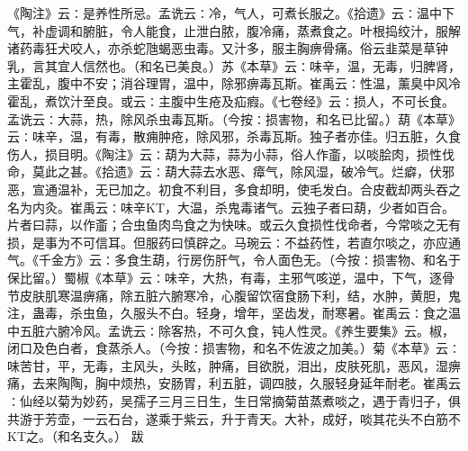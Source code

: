 \documentclass[a4paper,12pt,UTF8,twoside]{ctexbook}
\begin{document}
《陶注》云∶是养性所忌。孟诜云∶冷，气人，可煮长服之。《拾遗》云∶温中下气，补虚调和腑脏，令人能食，止泄白脓，腹冷痛，蒸煮食之。叶根捣绞汁，服解诸药毒狂犬咬人，亦杀蛇虺蝎恶虫毒。又汁多，服主胸痹骨痛。俗云韭菜是草钟乳，言其宜人信然也。（和名已美良。）苏《本草》云∶味辛，温，无毒，归脾肾，主霍乱，腹中不安；消谷理胃，温中，除邪痹毒瓦斯。崔禹云∶性温，薰臭中风冷霍乱，煮饮汁至良。或云∶主腹中生疮及疝瘕。《七卷经》云∶损人，不可长食。孟诜云∶大蒜，热，除风杀虫毒瓦斯。（今按∶损害物，和名已比留。）葫《本草》云∶味辛，温，有毒，散痈肿疮，除风邪，杀毒瓦斯。独子者亦佳。归五脏，久食伤人，损目明。《陶注》云∶葫为大蒜，蒜为小蒜，俗人作齑，以啖脍肉，损性伐命，莫此之甚。《拾遗》云∶葫大蒜去水恶、瘴气，除风湿，破冷气。烂癖，伏邪恶，宣通温补，无已加之。初食不利目，多食却明，使毛发白。合皮截却两头吞之名为内灸。崔禹云∶味辛KT，大温，杀鬼毒诸气。云独子者曰葫，少者如百合。片者曰蒜，以作齑；合虫鱼肉鸟食之为快味。或云久食损性伐命者，今常啖之无有损，是事为不可信耳。但服药曰慎辟之。马琬云∶不益药性，若直尔啖之，亦应通气。《千金方》云∶多食生葫，行房伤肝气，令人面色无。（今按∶损害物、和名于保比留。）蜀椒《本草》云∶味辛，大热，有毒，主邪气咳逆，温中，下气，逐骨节皮肤肌寒温痹痛，除五脏六腑寒冷，心腹留饮宿食肠下利，结，水肿，黄胆，鬼注，蛊毒，杀虫鱼，久服头不白。轻身，增年，坚齿发，耐寒暑。崔禹云∶食之温中五脏六腑冷风。孟诜云∶除客热，不可久食，钝人性灵。《养生要集》云。椒，闭口及色白者，食蒸杀人。（今按∶损害物，和名不佐波之加美。）菊《本草》云∶味苦甘，平，无毒，主风头，头眩，肿痛，目欲脱，泪出，皮肤死肌，恶风，湿痹痛，去来陶陶，胸中烦热，安肠胃，利五脏，调四肢，久服轻身延年耐老。崔禹云∶仙经以菊为妙药，吴孺子三月三日生，生日常摘菊苗蒸煮啖之，遇于青归子，俱共游于芳壶，一云石台，遂乘于紫云，升于青天。大补，成好，啖其花头不白筋不KT之。（和名支久。）
跋
\end{document}
